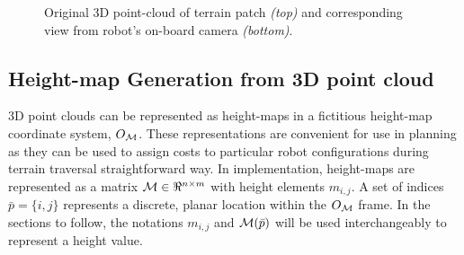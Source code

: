 				\begin{figure}[!h]
					\centering
					\caption{Original 3D point-cloud of terrain patch \emph{(top)} and corresponding view from robot's on-board camera \emph{(bottom)}.}
					\label{fig::pointcloud_terrain_patch}
				\end{figure}


		\subsection{Height-map Generation from 3D point cloud}
			
			3D point clouds can be represented as height-maps in a fictitious height-map coordinate system, $O_{{\cal M}}$. These representations are convenient for use in planning as they can be used to assign costs to particular robot configurations during terrain traversal straightforward way. In implementation, height-maps are represented as a matrix  ${\cal M}\in \Re^{n\times m}$ with height elements $m_{i,j}$. A set of indices $\bar{p} = \{i,j\}$ represents a discrete, planar location within the $O_{{\cal M}}$ frame. In the sections to follow, the notations $m_{i,j}$ and ${\cal M}(\bar{p})$ will be used interchangeably to represent a height value. 

